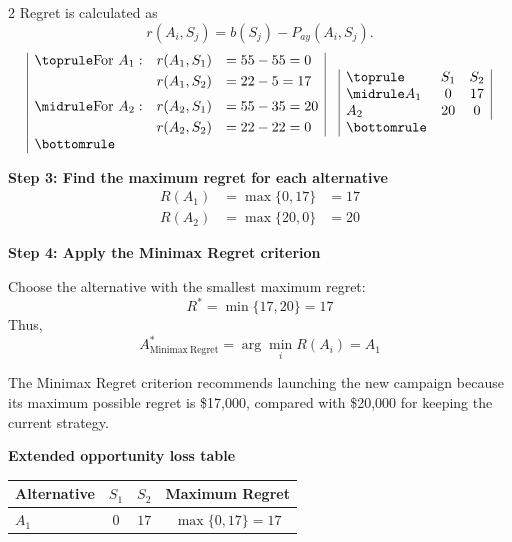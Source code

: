 \begin{multicols}{2}
		Regret is calculated as
		\[
		r(A_i,S_j)
		=
		b(S_j)-P_{ay}(A_i,S_j).
		\]
		\[
		\begin{array}{|lll|}
			\toprule
			\text{For } A_1: & r(A_1,S_1) &= 55-55 = 0 \\[3pt]
			& r(A_1,S_2) &= 22-5 = 17 \\[6pt]
			\midrule
			\text{For } A_2: & r(A_2,S_1) &= 55-35 = 20 \\[3pt]
			& r(A_2,S_2) &= 22-22 = 0 \\
			\bottomrule
		\end{array}
		\quad
		\begin{array}{|lcc|}
			\toprule
			& S_1 & S_2\\
			\midrule
			A_1 & 0 & 17\\
			A_2 & 20 & 0\\
			\bottomrule
		\end{array}
		\]
	
		
		\textbf{Step 3: Find the maximum regret for each alternative}
		\[
		\begin{array}{lll}
			R(A_1) &= \max\{0,17\} &= 17 \\[3pt]
			R(A_2) &= \max\{20,0\} &= 20
		\end{array}
		\]
		
		\textbf{Step 4: Apply the Minimax Regret criterion}
		
		Choose the alternative with the smallest maximum regret:
		\[
		R^*
		=
		\min\{17,20\}
		=
		17
		\]
		Thus,
		\[
		A^*_{\mathrm{Minimax\ Regret}}
		=
		\arg\min_i R(A_i)
		=
		A_1
		\]
		
		The Minimax Regret criterion recommends launching the new campaign
		because its maximum possible regret is \$17,000, compared with
		\$20,000 for keeping the current strategy.
		
		\setlength{\columnseprule}{0pt}
		
		\columnbreak
		\textbf{Extended opportunity loss table}
		
		\begin{center}
			\small
			\renewcommand{\arraystretch}{1.5}
			\setlength{\tabcolsep}{5pt}
			
			\begin{tabular}{lccc}
				\toprule
				Alternative & $S_1$ & $S_2$ & Maximum Regret \\
				\midrule
				
				$A_1$
				& $0$
				& $17$
				& $\max\{0,17\}=17$
				\\
				

\end{tabular}
\end{center}
\end{multicols}
